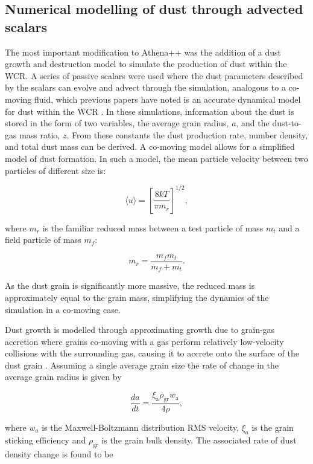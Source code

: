 \documentclass[fleqn,usenatbib]{mnras}
\begin{document}
\subsection{Numerical modelling of dust through advected scalars}

The most important modification to Athena++ was the addition of a dust growth and destruction model to simulate the production of dust within the WCR.
A series of passive scalars were used where the dust parameters described by the scalars can evolve and advect through the simulation, analogous to a co-moving fluid, which previous papers have noted is an accurate dynamical model for dust within the WCR \citep{hendrix_pinwheels_2016}.
In these simulations, information about the dust is stored in the form of two variables, the average grain radius, $a$, and the dust-to-gas mass ratio, $z$.
From these constants the dust production rate, number density, and total dust mass can be derived.
A co-moving model allows for a simplified model of dust formation. In such a model, the mean particle velocity between two particles of different size is:

\begin{equation}
  \langle u \rangle = \left[ \frac{8kT}{\pi m_r} \right] ^{1/2} ,
\end{equation}

\noindent
where $m_r$ is the familiar reduced mass between a test particle of mass $m_t$ and a field particle of mass $m_f$:

\begin{equation}
  m_r = \frac{m_f m_t}{m_f + m_t} .
\end{equation}

\noindent
As the dust grain is significantly more massive, the reduced mass is approximately equal to the grain mass, simplifying the dynamics of the simulation in a co-moving case.

Dust growth is modelled through approximating growth due to grain-gas accretion where grains co-moving with a gas perform relatively low-velocity collisions with the surrounding gas, causing it to accrete onto the surface of the dust grain 
\citep{spitzer_jr._physical_2008}.
Assuming a single average grain size the rate of change in the average grain radius is given by

\begin{equation}
  \frac{da}{dt} = \frac{\xi_\text{a} \rho_\text{gr} w_\text{a}}{4 \rho} ,
\end{equation}

\noindent
where $w_a$ is the Maxwell-Boltzmann distribution RMS velocity, $\xi_a$ is the grain sticking efficiency and $\rho_\text{gr}$ is the grain bulk density.
The associated rate of dust density change is found to be
\end{document}
